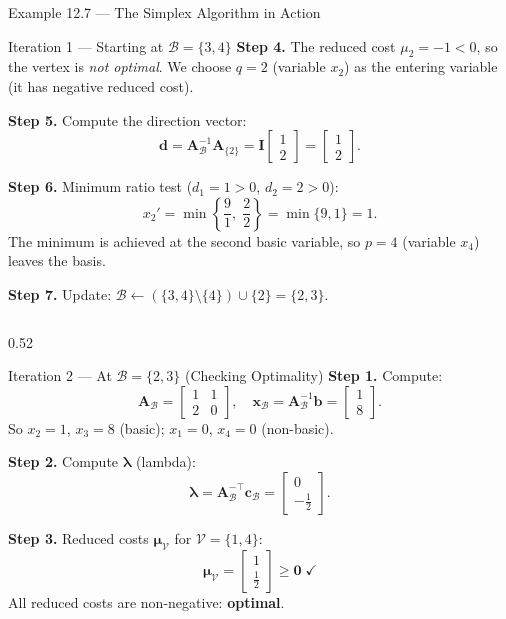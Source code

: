 \documentclass[aspectratio=169,10pt]{beamer}
\newcommand{\xv}{\mathbf{x}}
\newcommand{\cv}{\mathbf{c}}
\newcommand{\bv}{\mathbf{b}}
\newcommand{\Av}{\mathbf{A}}
\newcommand{\muv}{\boldsymbol{\mu}}
\newcommand{\lav}{\boldsymbol{\lambda}}
\newcommand{\calB}{\mathcal{B}}
\newcommand{\calV}{\mathcal{V}}
\begin{document}
\begin{frame}[allowframebreaks]{Example 12.7 --- The Simplex Algorithm in Action}
\begin{exampleblock}{Iteration 1 --- Starting at $\calB = \{3,4\}$}
\textbf{Step 4.} The reduced cost $\mu_2 = -1 < 0$, so the vertex is \emph{not optimal}.
We choose $q = 2$ (variable $x_2$) as the entering variable (it has negative reduced cost).

\textbf{Step 5.} Compute the direction vector:
\[
  \mathbf{d} = \Av_\calB^{-1}\Av_{\{2\}} = \mathbf{I}\begin{bmatrix}1\\2\end{bmatrix}
  = \begin{bmatrix}1\\2\end{bmatrix}.
\]

\textbf{Step 6.} Minimum ratio test ($d_1 = 1 > 0$, $d_2 = 2 > 0$):
\[
  x_2' = \min\left\{\frac{9}{1},\;\frac{2}{2}\right\} = \min\{9, 1\} = 1.
\]
The minimum is achieved at the second basic variable, so $p = 4$ (variable $x_4$)
leaves the basis.

\textbf{Step 7.} Update: $\calB \leftarrow (\{3,4\} \setminus \{4\}) \cup \{2\} = \{2,3\}$.
\end{exampleblock}

\framebreak

\begin{columns}
  \begin{column}{0.52\textwidth}
    \begin{exampleblock}{Iteration 2 --- At $\calB = \{2,3\}$ (Checking Optimality)}
      \textbf{Step 1.} Compute:
      \[
        \Av_\calB = \begin{bmatrix}1&1\\2&0\end{bmatrix},\quad
        \xv_\calB = \Av_\calB^{-1}\bv = \begin{bmatrix}1\\8\end{bmatrix}.
      \]
      So $x_2 = 1$, $x_3 = 8$ (basic); $x_1 = 0$, $x_4 = 0$ (non-basic).

      \textbf{Step 2.} Compute $\lav$ (lambda):
      \[
        \lav = \Av_\calB^{-\top}\cv_\calB
        = \begin{bmatrix}0\\-\tfrac{1}{2}\end{bmatrix}.
      \]

      \textbf{Step 3.} Reduced costs $\muv_\calV$ for $\calV = \{1,4\}$:
      \[
        \muv_\calV = \begin{bmatrix}1\\\tfrac{1}{2}\end{bmatrix} \ge \mathbf{0}\;\checkmark
      \]
      All reduced costs are non-negative: \textbf{optimal}.


\end{exampleblock}
\end{column}
\end{columns}
\end{frame}
\end{document}

